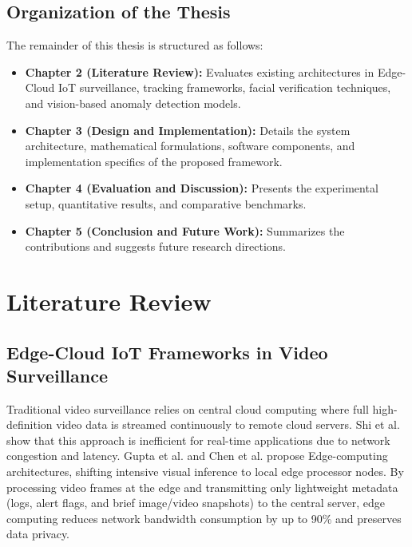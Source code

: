 \documentclass[12pt,a4paper]{article}
\begin{document}
\subsection{Organization of the Thesis}
The remainder of this thesis is structured as follows:
\begin{itemize}
    \item \textbf{Chapter 2 (Literature Review):} Evaluates existing architectures in Edge-Cloud IoT surveillance, tracking frameworks, facial verification techniques, and vision-based anomaly detection models.
    \item \textbf{Chapter 3 (Design and Implementation):} Details the system architecture, mathematical formulations, software components, and implementation specifics of the proposed framework.
    \item \textbf{Chapter 4 (Evaluation and Discussion):} Presents the experimental setup, quantitative results, and comparative benchmarks.
    \item \textbf{Chapter 5 (Conclusion and Future Work):} Summarizes the contributions and suggests future research directions.
\end{itemize}

\newpage

\section{Literature Review}

\subsection{Edge-Cloud IoT Frameworks in Video Surveillance}
Traditional video surveillance relies on central cloud computing where full high-definition video data is streamed continuously to remote cloud servers. Shi et al. \cite{shi_edge_2016} show that this approach is inefficient for real-time applications due to network congestion and latency. Gupta et al. \cite{gupta_ifogsim_2017} and Chen et al. \cite{chen_edge_2019} propose Edge-computing architectures, shifting intensive visual inference to local edge processor nodes. By processing video frames at the edge and transmitting only lightweight metadata (logs, alert flags, and brief image/video snapshots) to the central server, edge computing reduces network bandwidth consumption by up to 90\% and preserves data privacy.
\end{document}
